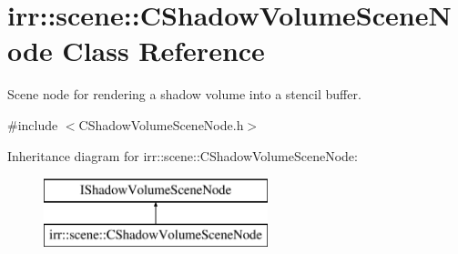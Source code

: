\hypertarget{classirr_1_1scene_1_1_c_shadow_volume_scene_node}{\section{irr\-:\-:scene\-:\-:C\-Shadow\-Volume\-Scene\-Node Class Reference}
\label{classirr_1_1scene_1_1_c_shadow_volume_scene_node}
}


Scene node for rendering a shadow volume into a stencil buffer.  




{\ttfamily \#include $<$C\-Shadow\-Volume\-Scene\-Node.\-h$>$}

Inheritance diagram for irr\-:\-:scene\-:\-:C\-Shadow\-Volume\-Scene\-Node\-:\begin{figure}[H]
\begin{center}
\leavevmode
\includegraphics[height=2.000000cm]{classirr_1_1scene_1_1_c_shadow_volume_scene_node}
\end{center}
\end{figure}
